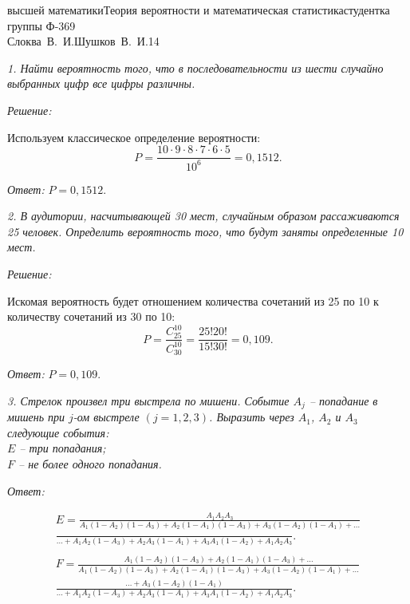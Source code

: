 




{высшей математики}{Теория вероятности и математическая статистика}{студентка
группы Ф-369\\Слоква~В.~И.}{Шушков~В.~И.}{\!\!}{14}

\emph{1. Найти вероятность того, что в последовательности из шести случайно выбранных
цифр все цифры различны.}

\vspace*{2em}
\emph{Решение:}

Используем классическое определение вероятности:
\[
    P = \frac{10\cdot 9\cdot 8\cdot 7\cdot 6\cdot 5}{10^6} = 0,1512.
\]

\vspace*{2em}
\emph{Ответ:} \( P = 0,1512 \).

\vspace*{3em}

\emph{2. В аудитории, насчитывающей 30 мест, случайным образом рассаживаются 25
человек. Определить вероятность того, что будут заняты определенные 10 мест.}

\vspace*{2em}
\emph{Решение:}

Искомая вероятность будет отношением количества сочетаний из 25 по 10 к
количеству сочетаний из 30 по 10:
\[
    P = \frac{C_{25}^{10}}{C_{30}^{10}} = \frac{25!20!}{15!30!} = 0,109.
\]

\vspace*{2em}
\emph{Ответ:} \( P = 0,109 \).

\pagebreak

\emph{3. Стрелок произвел три выстрела по мишени. Событие \( A_j \) -- попадание в
мишень при \( j \)-ом выстреле \( (j = 1, 2, 3) \). Выразить через \( A_1 \),
\( A_2 \) и \( A_3 \) следующие события: \\
\( E \) -- три попадания; \\
\( F \) -- не более одного попадания.}

\vspace*{2em}
\emph{Ответ:}

\begin{align*}
    E = \frac{A_1A_2A_3}{A_1(1-A_2)(1-A_3) + A_2(1-A_1)(1-A_3) + A_3(1-A_2)
    (1-A_1) + \ldots} \\
    \frac{}{\ldots + A_1A_2(1-A_3) + A_2A_3(1-A_1) + A_3A_1(1-A_2) + A_1A_2A_3}.
    \\ \\
    F = \frac{A_1(1-A_2)(1-A_3) + A_2(1-A_1)(1-A_3) + \ldots}{A_1(1-A_2)(1-A_3)
    + A_2(1-A_1)(1-A_3) + A_3(1-A_2)(1-A_1) + \ldots} \\
    \frac{\ldots + A_3(1-A_2)(1-A_1)}{\ldots + A_1A_2(1-A_3) + A_2A_3(1-A_1) +
    A_3A_1(1-A_2) + A_1A_2A_3}.
\end{align*}


